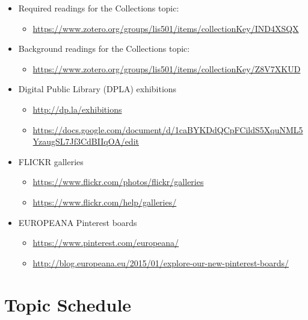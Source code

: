 \documentclass[]{article}
\providecommand{\tightlist}{%
  \setlength{\itemsep}{0pt}\setlength{\parskip}{0pt}}
\begin{document}
\begin{itemize}
\tightlist
\item
  Required readings for the Collections topic:

  \begin{itemize}
  \tightlist
  \item
    \url{https://www.zotero.org/groups/lis501/items/collectionKey/IND4XSQX}
  \end{itemize}
\item
  Background readings for the Collections topic:

  \begin{itemize}
  \tightlist
  \item
    \url{https://www.zotero.org/groups/lis501/items/collectionKey/Z8V7XKUD}\\
  \end{itemize}
\item
  Digital Public Library (DPLA) exhibitions

  \begin{itemize}
  \tightlist
  \item
    \url{http://dp.la/exhibitions}
  \item
    \url{https://docs.google.com/document/d/1caBYKDdQCpFCildS5XquNML5YzaugSL7Jf3CdBIIqOA/edit}
  \end{itemize}
\item
  FLICKR galleries

  \begin{itemize}
  \tightlist
  \item
    \url{https://www.flickr.com/photos/flickr/galleries}
  \item
    \url{https://www.flickr.com/help/galleries/}
  \end{itemize}
\item
  EUROPEANA Pinterest boards

  \begin{itemize}
  \tightlist
  \item
    \url{https://www.pinterest.com/europeana/}
  \item
    \url{http://blog.europeana.eu/2015/01/explore-our-new-pinterest-boards/}
  \end{itemize}
\end{itemize}

\section{Topic Schedule}\label{topic-schedule}
\end{document}
